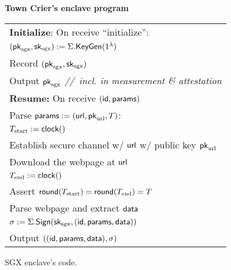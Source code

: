 \begin{figure}
\begin{boxedminipage}{\columnwidth}
\begin{center}
{\bf Town Crier's enclave program}
\end{center}
\begin{tabular}{l}
{\bf Initialize}:  On receive ``initialize'': \\ %
\quad $({\sf pk}_{\textrm{sgx}}, {\sf sk}_{\textrm{sgx}}) := \Sigma.{\sf KeyGen}(1^\lambda)$\\
\quad Record $({\sf pk}_{\textrm{sgx}}, {\sf sk}_{\textrm{sgx}})$\\
\quad Output ${\sf pk}_{\textrm{sgx}}$   {\it //~incl. in measurement \& attestation } 
\\[5pt]

{\bf Resume:} On receive $({\sf id}, {\sf params})$\\
\quad Parse ${\sf params} := ({{\sf url}}, {\sf pk}_{\textrm{url}}, T) $:\\
\quad $T_{\textrm{start}} := {{\sf clock}}()$\\
\quad Establish secure channel w/ ${{\sf url}}$ w/ public key ${\sf pk}_{\textrm{url}}$ \\
\quad Download the webpage at ${{\sf url}}$\\
\quad $T_{\textrm{end}}: = {{\sf clock}}()$\\
\quad Assert ${\sf round}(T_{\textrm{start}}) = {\sf round}(T_{\textrm{end}}) = T$\\
\quad Parse webpage and extract ${\sf data}$\\
\quad $\sigma := \Sigma.{\sf Sign}({{\sf sk}_{\textrm{sgx}}}, ({\sf id}, {\sf params}, {\sf data}))$\\
\quad Output $(({\sf id}, {\sf params}, {\sf data}), \sigma)$
\end{tabular}
\end{boxedminipage}
\caption{
SGX enclave's code.
} 
\end{figure}


